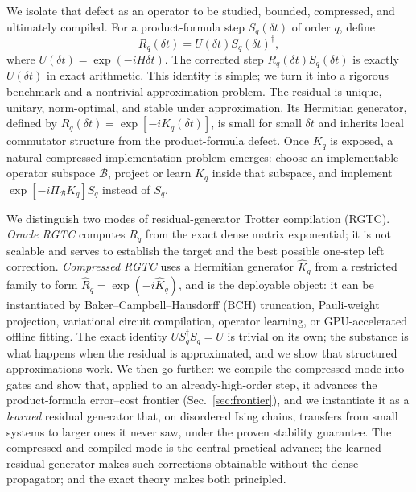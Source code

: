 \documentclass[aps,prresearch,reprint,superscriptaddress,nofootinbib,amsmath,amssymb]{revtex4-2}
\newcommand{\rgtc}{RGTC}
\newcommand{\cB}{\mathcal{B}}
\newcommand{\dt}{\delta t}
\begin{document}
We isolate that defect as an operator to be studied, bounded, compressed, and ultimately compiled. For a product-formula step $S_q(\dt)$ of order $q$, define
\begin{equation}
    R_q(\dt)=U(\dt)S_q(\dt)^\dagger,
    \label{eq:intro-residual}
\end{equation}
where $U(\dt)=\exp(-iH\dt)$. The corrected step $R_q(\dt)S_q(\dt)$ is exactly $U(\dt)$ in exact arithmetic. This identity is simple; we turn it into a rigorous benchmark and a nontrivial approximation problem. The residual is unique, unitary, norm-optimal, and stable under approximation. Its Hermitian generator, defined by $R_q(\dt)=\exp[-iK_q(\dt)]$, is small for small $\dt$ and inherits local commutator structure from the product-formula defect. Once $K_q$ is exposed, a natural compressed implementation problem emerges: choose an implementable operator subspace $\cB$, project or learn $K_q$ inside that subspace, and implement $\exp[-i\Pi_{\cB}K_q]S_q$ instead of $S_q$.

We distinguish two modes of residual-generator Trotter compilation (\rgtc{}). \emph{Oracle \rgtc{}} computes $R_q$ from the exact dense matrix exponential; it is not scalable and serves to establish the target and the best possible one-step left correction. \emph{Compressed \rgtc{}} uses a Hermitian generator $\widehat K_q$ from a restricted family to form $\widehat R_q=\exp(-i\widehat K_q)$, and is the deployable object: it can be instantiated by Baker--Campbell--Hausdorff (BCH) truncation, Pauli-weight projection, variational circuit compilation, operator learning, or GPU-accelerated offline fitting. The exact identity $US_q^\dagger S_q=U$ is trivial on its own; the substance is what happens when the residual is approximated, and we show that structured approximations work. We then go further: we compile the compressed mode into gates and show that, applied to an already-high-order step, it advances the product-formula error--cost frontier (Sec.~\ref{sec:frontier}), and we instantiate it as a \emph{learned} residual generator that, on disordered Ising chains, transfers from small systems to larger ones it never saw, under the proven stability guarantee. The compressed-and-compiled mode is the central practical advance; the learned residual generator makes such corrections obtainable without the dense propagator; and the exact theory makes both principled.
\end{document}
